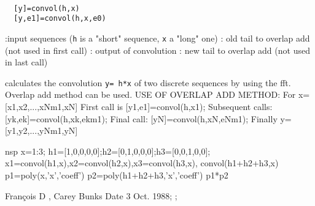 
\begin{mandesc}
   \\ %
\end{mandesc}
\begin{calling_sequence}
\begin{verbatim}
  [y]=convol(h,x)  
  [y,e1]=convol(h,x,e0)  
\end{verbatim}
\end{calling_sequence}
\begin{parameters}
  \begin{varlist}
    :input sequences (\verb!h! is a "short" sequence, 
    \verb!x! a "long" one)
    : old tail to overlap add (not used in first call)
    : output of convolution
    : new tail to overlap add (not used in last call)
  \end{varlist}
\end{parameters}
\begin{mandescription}
  calculates the convolution \verb!y= h*x! of two
  discrete sequences by using the fft.  Overlap add method can be used.
  USE OF OVERLAP ADD METHOD: 
  For x=[x1,x2,...,xNm1,xN]
  First call is [y1,e1]=convol(h,x1); 
  Subsequent calls: [yk,ek]=convol(h,xk,ekm1);
  Final call: [yN]=convol(h,xN,eNm1);
  Finally y=[y1,y2,...,yNm1,yN]
\end{mandescription}
\begin{examples}
  \begin{mintednsp}{nsp}
    x=1:3;
    h1=[1,0,0,0,0];h2=[0,1,0,0,0];h3=[0,0,1,0,0];
    x1=convol(h1,x),x2=convol(h2,x),x3=convol(h3,x),
    convol(h1+h2+h3,x)
    p1=poly(x,'x','coeff')
    p2=poly(h1+h2+h3,'x','coeff')
    p1*p2
  \end{mintednsp}
\end{examples}
\begin{manseealso}
      
\end{manseealso}
\begin{authors}
  Fran\c{c}ois D , Carey Bunks Date 3 Oct. 1988; ;   
\end{authors}
